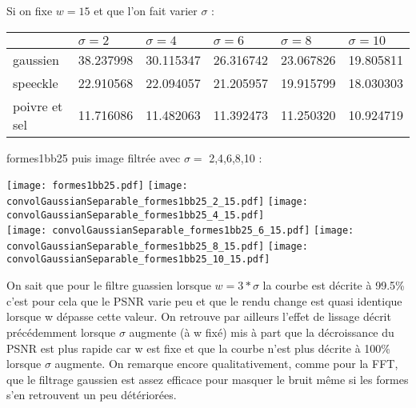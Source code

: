 \documentclass[12pt]{article}
\numberwithin{equation}{section}
\begin{document}
Si on fixe $w = 15$ et que l'on fait varier $\sigma$ :
\begin{center}
  \begin{tabular}{|l|l|l|l|l|l|}
    \hline
    & $\sigma = 2$ & $\sigma = 4$ & $\sigma = 6$  & $\sigma = 8$ & $\sigma = 10$ \\
    \hline
    gaussien & 38.237998  & 30.115347  & 26.316742 & 23.067826  & 19.805811\\
    \hline
    speeckle & 22.910568  & 22.094057 & 21.205957  &19.915799 & 18.030303 \\
    \hline
    poivre et sel & 11.716086  & 11.482063 & 11.392473  &  11.250320 & 10.924719\\
    \hline
  \end{tabular}
\end{center}


formes1bb25 puis image filtrée avec $\sigma =$ 2,4,6,8,10 :\\

\begin{center}
\texttt{[image: formes1bb25.pdf]}
\texttt{[image: convolGaussianSeparable\_formes1bb25\_2\_15.pdf]}
\texttt{[image: convolGaussianSeparable\_formes1bb25\_4\_15.pdf]}\\
\texttt{[image: convolGaussianSeparable\_formes1bb25\_6\_15.pdf]}
\texttt{[image: convolGaussianSeparable\_formes1bb25\_8\_15.pdf]}
\texttt{[image: convolGaussianSeparable\_formes1bb25\_10\_15.pdf]}\\
\end{center}

On sait que pour le filtre guassien lorsque $w = 3*\sigma$ la courbe est décrite à 99.5\% c'est pour cela que le PSNR varie peu et que le rendu change est quasi identique lorsque w dépasse cette valeur. On retrouve par ailleurs l'effet de lissage décrit précédemment lorsque $\sigma$ augmente (à w fixé) mis à part que la décroissance du PSNR est plus rapide car w est fixe et que la courbe n'est plus décrite à 100\% lorsque $\sigma$ augmente. On remarque encore qualitativement, comme pour la FFT, que le filtrage gaussien est assez efficace pour masquer le bruit même si les formes s'en retrouvent un peu détériorées.
\end{document}
